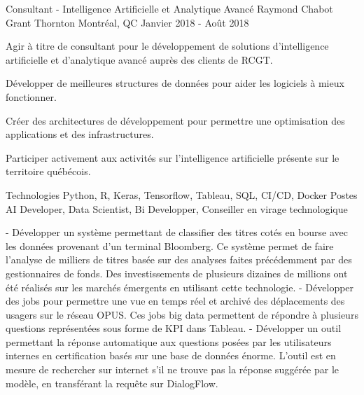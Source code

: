 \begin{cventries}
  \cventry
    {Consultant - Intelligence Artificielle et Analytique Avancé}
    {Raymond Chabot Grant Thornton}
    {Montréal, QC}
    {Janvier 2018 - Août 2018}
    {
      \begin{cvitems}
        \item {Agir à titre de consultant pour le développement de solutions d’intelligence artificielle et d’analytique avancé auprès des clients de RCGT.}
        \item {Développer de meilleures structures de données pour aider les logiciels à mieux fonctionner.}
		\item {Créer des architectures de développement pour permettre une optimisation des applications et des infrastructures.}
		\item {Participer activement aux activités sur l’intelligence artificielle présente sur le territoire québécois.}
		\vspace{2mm}
        \begin{cvskills}
          \cvskill
          {Technologies}
    	  {Python, R, Keras, Tensorflow, Tableau, SQL, CI/CD, Docker}
    	  \cvskill
          {Postes}
    	  {AI Developer, Data Scientist, Bi Developper, Conseiller en virage technologique}
        \end{cvskills}
		\begin{cvsubentries}
			{
				- Développer un système permettant de classifier des titres cotés en bourse avec les données provenant d'un terminal Bloomberg. Ce système permet de faire l'analyse de milliers de titres basée sur des analyses faites précédemment par des gestionnaires de fonds. Des investissements de plusieurs dizaines de millions ont été réalisés sur les marchés émergents en utilisant cette technologie.
			}
			{
				- Développer des jobs pour permettre une vue en temps réel et archivé des déplacements des usagers sur le réseau OPUS. Ces jobs big data permettent de répondre à plusieurs questions représentées sous forme de KPI dans Tableau.
			}
			{
				- Développer un outil permettant la réponse automatique aux questions posées par les utilisateurs internes en certification basés sur une base de données énorme. L’outil est en mesure de rechercher sur internet s’il ne trouve pas la réponse suggérée par le modèle, en transférant la requête sur DialogFlow.
			}

\end{cvsubentries}
\end{cvitems}}
\end{cventries}
